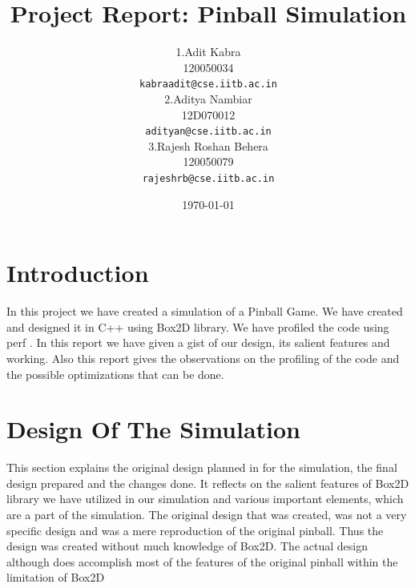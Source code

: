 \documentclass[11pt]{article}
\begin{document}
\title{Project Report: Pinball Simulation}
\author{1.Adit Kabra\\
          120050034\\
          \texttt{kabraadit@cse.iitb.ac.in}\\
        2.Aditya Nambiar\\
          12D070012\\
          \texttt{adityan@cse.iitb.ac.in}\\
        3.Rajesh Roshan Behera\\
          120050079\\
          \texttt{rajeshrb@cse.iitb.ac.in}\\}
\date{\today}
\maketitle
\newpage
\tableofcontents

\newpage
\section{Introduction}
In this project we have created a simulation of a Pinball Game. We have created and designed it in C++ using Box2D library.
We have profiled the code using perf . In this report we have given a gist of our design, its salient features and working. Also this report
gives the observations on the profiling of the code and the possible optimizations that can be done.


\section{Design Of The Simulation}
This section explains the original design planned in for the simulation, the final
design prepared and the changes done. It reflects on the salient features of Box2D library we have utilized in our simulation and various important elements, which are a part of the simulation. The original design that was created, was not a very specific design and was a mere reproduction of the original pinball. Thus the design was created without much knowledge of Box2D. The actual design although does accomplish most of the features of the original pinball within the limitation of Box2D
\end{document}
